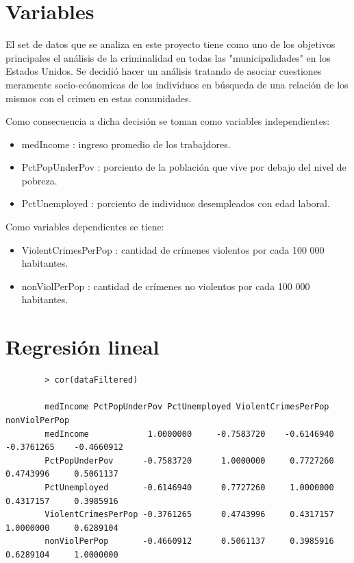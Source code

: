 \documentclass[a4paper,10pt,twocolumn]{article}
\begin{document}
\section{Variables}\label{sec:ex1.0}
El set de datos que se analiza en este proyecto tiene como uno de los objetivos principales el análisis de 
la criminalidad en todas las "municipalidades" en los Estados Unidos. Se decidió hacer un análisis tratando
 de asociar cuestiones meramente socio-ecónomicas de los individuos en búsqueda de una relación de los mismos con 
 el crimen en estas comunidades.

 Como consecuencia a dicha decisión se toman como variables independientes:
 \begin{itemize}
	 \item medIncome : ingreso promedio de los trabajdores.
	 \item PctPopUnderPov : porciento de la población que vive por debajo del nivel de pobreza.
	 \item PctUnemployed : porciento de individuos desempleados con edad laboral.	 
 \end{itemize}

 Como variables dependientes se tiene:
 \begin{itemize}
	 \item ViolentCrimesPerPop : cantidad de crímenes violentos por cada 100 000 habitantes.
	 \item nonViolPerPop : cantidad de crímenes no violentos por cada 100 000 habitantes.
 \end{itemize}
\section{Regresión lineal}\label{sec:ex1.1}
\begin{multicols*}{2}
	
	\begin{verbatim}
		> cor(dataFiltered)
		
		medIncome PctPopUnderPov PctUnemployed ViolentCrimesPerPop nonViolPerPop
		medIncome            1.0000000     -0.7583720    -0.6146940          -0.3761265    -0.4660912
		PctPopUnderPov      -0.7583720      1.0000000     0.7727260           0.4743996     0.5061137
		PctUnemployed       -0.6146940      0.7727260     1.0000000           0.4317157     0.3985916
		ViolentCrimesPerPop -0.3761265      0.4743996     0.4317157           1.0000000     0.6289104
		nonViolPerPop       -0.4660912      0.5061137     0.3985916           0.6289104     1.0000000
	\end{verbatim}
\end{multicols*}
\end{document}
